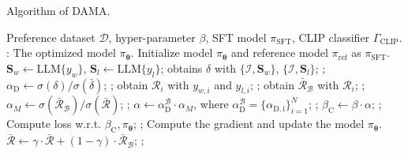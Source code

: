 \begin{algorithm}[t]
   \caption{Algorithm of DAMA.}
   \label{algorithm}
\begin{algorithmic}
    Preference dataset $\mathcal{D}$, hyper-parameter $\beta$, SFT model $\pi_{\text{SFT}}$, CLIP classifier $\Gamma_{\text{CLIP}}$.
   : The optimized model $\pi_{\bm{\theta}}$.
   \STATE Initialize model $\pi_{\bm{\theta}}$ and reference model $\pi_{\text{ref}}$ as $\pi_{\text{SFT}}$.
        \STATE 
        $\mathbf{S}_{w} \gets \text{LLM}\{y_w\}$, $\mathbf{S}_{l} \gets \text{LLM}\{y_l\}$;
        \STATE obtains $\delta$ with $\{\mathcal{I}, \mathbf{S}_{w}\}$, $\{\mathcal{I}, \mathbf{S}_{l}\}$; ;
        \STATE $\alpha_{\mathrm{D}} \gets \sigma(\delta) / \sigma(\bar{\delta})$; ;
    \ENDFOR
   \REPEAT
        \STATE obtain $\mathcal{R}_{i}$ with $y_{w,i}$ and $y_{l,i}$; ;
        \STATE obtain $\bar{\mathcal{R}}_{\mathcal{B}}$ with $\mathcal{R}_{i}$;
        ;
        \STATE $\alpha_{M}  \gets \sigma(\bar{\mathcal{R}}_{\mathcal{B}}) / \sigma(\bar{\mathcal{R}})$; ;
        \STATE $\alpha \gets \alpha_{\mathrm{D}}^{\mathcal{B}} \cdot \alpha_{M}$, where $ \alpha_{\mathrm{D}}^{\mathcal{B}} = \{ {\alpha_{\mathrm{D,i}}}\}_{i=1}^{N}$;
        ; 
        \STATE $\beta_{\mathrm{C}} \gets \beta \cdot \alpha$; ; 
        \STATE Compute loss {w.r.t.} $\beta_{\mathrm{C}}, \pi_{\bm{\theta}}$; ;
        \STATE Compute the gradient and update the model $\pi_{\bm{\theta}}$.
        \STATE $\bar{\mathcal{R}} \bm{\leftarrow} \gamma \cdot  \bar{\mathcal{R}} + (1- \gamma) \cdot \bar{\mathcal{R}}_{\mathcal{B}}$; ;
    \ENDFOR
\end{algorithmic}
\end{algorithm}

